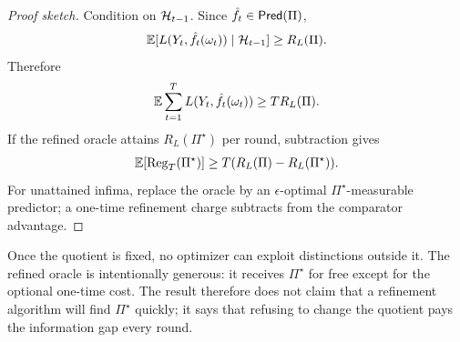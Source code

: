 \begin{proof}[Proof sketch]
Condition on $\mathcal{H}_{t-1}$. Since $\hat f_t\in\mathsf{Pred}(\Pi)$,
\begin{align*}
\operatorname*{\mathbb{E}}[L(Y_t,\hat f_t(\omega_t))\mid \mathcal{H}_{t-1}]
\ge R_L(\Pi).
\end{align*}
Therefore
\begin{align*}
\operatorname*{\mathbb{E}}\sum_{t=1}^T L(Y_t,\hat f_t(\omega_t))
\ge
T R_L(\Pi).
\end{align*}
If the refined oracle attains $R_L(\Pi^\star)$ per round, subtraction gives
\begin{align*}
\operatorname*{\mathbb{E}}[\mathrm{Reg}_T(\Pi^\star)]
\ge
T(R_L(\Pi)-R_L(\Pi^\star)).
\end{align*}
For unattained infima, replace the oracle by an $\epsilon$-optimal $\Pi^\star$-measurable predictor; a one-time refinement charge subtracts from the comparator advantage.
\end{proof}

Once the quotient is fixed, no optimizer can exploit distinctions outside it. The refined oracle is intentionally generous: it receives $\Pi^\star$ for free except for the optional one-time cost. The result therefore does not claim that a refinement algorithm will find $\Pi^\star$ quickly; it says that refusing to change the quotient pays the information gap every round.
